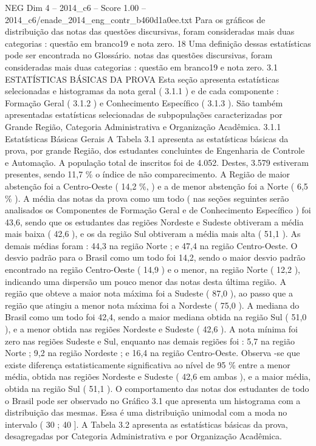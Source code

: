 \begin{textsample}{NEG Dim 4 – 2014\_c6 – Score 1.00 – 2014\_c6/enade\_2014\_eng\_contr\_b460d1a0ee.txt}
Para os gráficos de distribuição das notas das questões discursivas, foram consideradas mais duas categorias : questão em branco19 e nota zero. 18 Uma definição dessas estatísticas pode ser encontrada no Glossário. notas das questões discursivas, foram consideradas mais duas categorias : questão em branco19 e nota zero. 3.1 ESTATÍSTICAS BÁSICAS DA PROVA Esta seção apresenta estatísticas selecionadas e histogramas da nota geral ( 3.1.1 ) e de cada componente : Formação Geral ( 3.1.2 ) e Conhecimento Específico ( 3.1.3 ).
São também apresentadas estatísticas selecionadas de subpopulações caracterizadas por Grande Região, Categoria Administrativa e Organização Acadêmica. 3.1.1 Estatísticas Básicas Gerais A Tabela 3.1 apresenta as estatísticas básicas da prova, por grande Região, dos estudantes concluintes de Engenharia de Controle e Automação.
A população total de inscritos foi de 4.052.
Destes, 3.579 estiveram presentes, sendo 11,7 \% o índice de não comparecimento.
A Região de maior abstenção foi a Centro-Oeste ( 14,2 \%, ) e a de menor abstenção foi a Norte ( 6,5 \% ).
A média das notas da prova como um todo ( nas seções seguintes serão analisados os Componentes de Formação Geral e de Conhecimento Específico ) foi 43,6, sendo que os estudantes das regiões Nordeste e Sudeste obtiveram a média mais baixa ( 42,6 ), e os da região Sul obtiveram a média mais alta ( 51,1 ).
As demais médias foram : 44,3 na região Norte ; e 47,4 na região Centro-Oeste.
O desvio padrão para o Brasil como um todo foi 14,2, sendo o maior desvio padrão encontrado na região Centro-Oeste ( 14,9 ) e o menor, na região Norte ( 12,2 ), indicando uma dispersão um pouco menor das notas desta última região.
A região que obteve a maior nota máxima foi a Sudeste ( 87,0 ), ao passo que a região que atingiu a menor nota máxima foi a Nordeste ( 75,0 ).
A mediana do Brasil como um todo foi 42,4, sendo a maior mediana obtida na região Sul ( 51,0 ), e a menor obtida nas regiões Nordeste e Sudeste ( 42,6 ).
A nota mínima foi zero nas regiões Sudeste e Sul, enquanto nas demais regiões foi : 5,7 na região Norte ; 9,2 na região Nordeste ; e 16,4 na região Centro-Oeste.
Observa -se que existe diferença estatisticamente significativa ao nível de 95 \% entre a menor média, obtida nas regiões Nordeste e Sudeste ( 42,6 em ambas ), e a maior média, obtida na região Sul ( 51,1 ).
O comportamento das notas dos estudantes de todo o Brasil pode ser observado no Gráfico 3.1 que apresenta um histograma com a distribuição das mesmas.
Essa é uma distribuição unimodal com a moda no intervalo ( 30 ; 40 ].
A Tabela 3.2 apresenta as estatísticas básicas da prova, desagregadas por Categoria Administrativa e por Organização Acadêmica.

\end{textsample}
